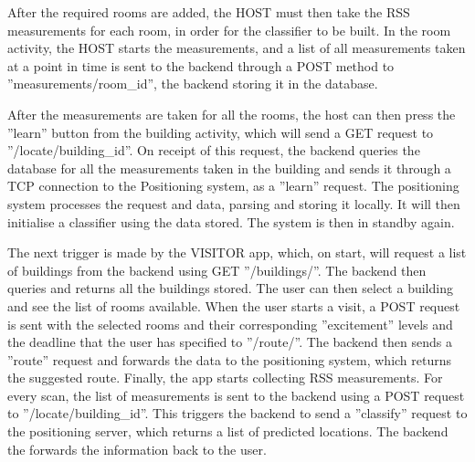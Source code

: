 After the required rooms are added, the HOST must then take the RSS measurements for each room, in order for the classifier to be built. In the room activity, the HOST starts the measurements, and a list of all measurements taken at a point in time is sent to the backend through a POST method to ”measurements/room\_id”, the backend storing it in the database.

After the measurements are taken for all the rooms, the host can then press the ”learn” button from the building activity, which will send a GET request to ”/locate/building\_id”. On receipt of this request, the backend queries the database for all the measurements taken in the building and sends it through a TCP connection to the Positioning system, as a ”learn” request. The positioning system processes the request and data, parsing and storing it locally. It will then initialise a classifier using the data stored. The system is then in standby again.

The next trigger is made by the VISITOR app, which, on start, will request a list of buildings from the backend using GET ”/buildings/”. The backend then queries and returns all the buildings stored. The user can then select a building and see the list of rooms available. When the user starts a visit, a POST request is sent with the selected rooms and their corresponding ”excitement” levels and the deadline that the user has specified to ”/route/”. The backend then sends a ”route” request and forwards the data to the positioning system, which returns the suggested route. Finally, the app starts collecting RSS measurements. For every scan, the list of measurements is sent to the backend using a POST request to ”/locate/building\_id”. This triggers the backend to send a ”classify” request to the positioning server, which returns a list of predicted locations. The backend the forwards the information back to the user.

